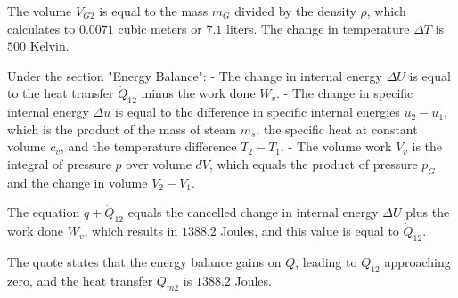 The volume \( V_{G2} \) is equal to the mass \( m_{G} \) divided by the density \( \rho \), which calculates to \( 0.0071 \) cubic meters or \( 7.1 \) liters. The change in temperature \( \Delta T \) is \( 500 \) Kelvin.

Under the section "Energy Balance":
- The change in internal energy \( \Delta U \) is equal to the heat transfer \( \dot{Q}_{12} \) minus the work done \( W_v \).
- The change in specific internal energy \( \Delta u \) is equal to the difference in specific internal energies \( u_2 - u_1 \), which is the product of the mass of steam \( m_s \), the specific heat at constant volume \( c_v \), and the temperature difference \( T_2 - T_1 \).
- The volume work \( V_v \) is the integral of pressure \( p \) over volume \( dV \), which equals the product of pressure \( p_G \) and the change in volume \( V_2 - V_1 \).

The equation \( q + \dot{Q}_{12} \) equals the cancelled change in internal energy \( \Delta U \) plus the work done \( W_v \), which results in \( 1388.2 \) Joules, and this value is equal to \( \dot{Q}_{12} \).

The quote states that the energy balance gains on \( Q \), leading to \( Q_{12} \) approaching zero, and the heat transfer \( Q_{m2} \) is \( 1388.2 \) Joules.
